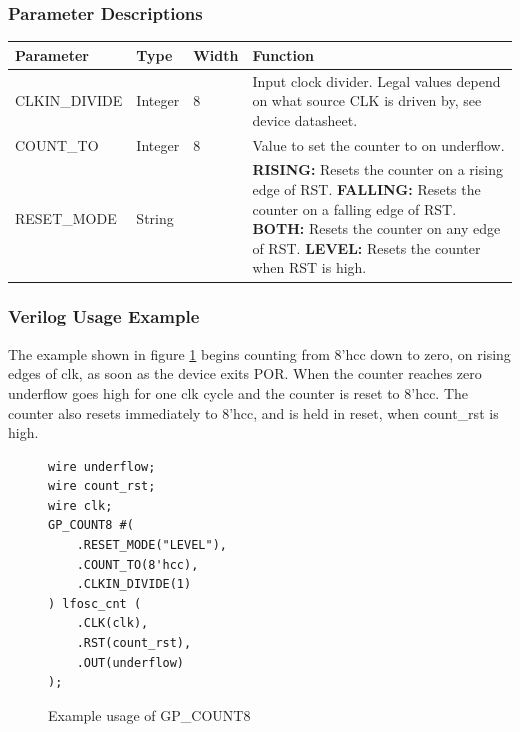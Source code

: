 \documentclass[11pt]{article}
\begin{document}
\subsubsection{Parameter Descriptions}

\begin{tabularx}{5in}{|l|l|l|X|}
\hline
{\bfseries Parameter} & {\bfseries Type} & {\bfseries Width} & {\bfseries Function} \\
\hline
CLKIN\_DIVIDE & Integer & 8 &
	Input clock divider. Legal values depend on what source CLK is driven by, see device datasheet.\\
\hline
COUNT\_TO & Integer & 8 & Value to set the counter to on underflow. \\
\hline
RESET\_MODE & String &  & 
	{\bfseries RISING: } \newline Resets the counter on a rising edge of RST. \newline
	{\bfseries FALLING: } \newline Resets the counter on a falling edge of RST. \newline
	{\bfseries BOTH: } \newline Resets the counter on any edge of RST. \newline
	{\bfseries LEVEL: } \newline Resets the counter when RST is high. \\
\hline
\end{tabularx}

\pagebreak
\subsubsection{Verilog Usage Example}

The example shown in figure \ref{gp-count8-example} begins counting from 8'hcc down to zero, on rising edges of clk, as 
soon as the device exits POR. When the counter reaches zero underflow goes high for one clk cycle and the counter is 
reset to 8'hcc. The counter also resets immediately to 8'hcc, and is held in reset, when count\_rst is high.

\begin{figure}[h]
\begin{lstlisting}
wire underflow;
wire count_rst;
wire clk;
GP_COUNT8 #(
	.RESET_MODE("LEVEL"),
	.COUNT_TO(8'hcc),
	.CLKIN_DIVIDE(1)
) lfosc_cnt (
	.CLK(clk),
	.RST(count_rst),
	.OUT(underflow)
);
\end{lstlisting}
\caption{Example usage of GP\_COUNT8}
\label{gp-count8-example}
\end{figure}
\end{document}
